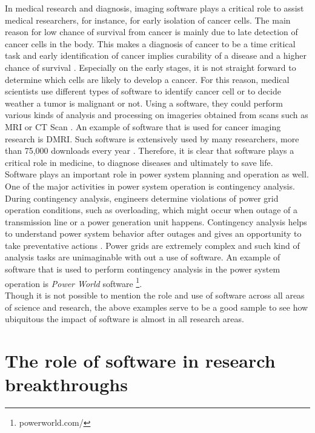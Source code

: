 In medical research and diagnosis, imaging software plays a critical role to assist medical researchers, for instance, for early isolation of cancer cells.  The main reason for low chance of survival from cancer is mainly due to late detection of cancer cells in the body. This makes a diagnosis of cancer to be a time critical task and early identification of cancer implies curability of a disease and a higher chance of survival \citep{wagner2004challenges}. Especially on the early stages, it is not straight forward to determine which cells are likely to develop a cancer. For this reason, medical scientists use different types of software to identify cancer cell or to decide weather a tumor is malignant or not. Using a software, they could perform various kinds of analysis and processing on imageries obtained from scans such as \ac{MRI} or \ac{CT} Scan \citep{al2012lung}. An example of software that is used for cancer imaging research is DMRI. Such software is extensively used by many researchers, more than 75,000 downloads every year \citep{norton2017slicerdmri}. Therefore, it is clear that software plays a critical role in medicine, to diagnose diseases and ultimately to save life. \\


Software plays an important role in power system planning and operation as well. One of the major activities in power system operation is contingency analysis. During contingency analysis, engineers determine violations of power grid operation conditions, such as overloading, which might occur when outage of a transmission line or a power generation unit happens. Contingency analysis helps to understand power system behavior after outages and gives an opportunity to take preventative actions \citep{mishra2012contingency}. Power grids are extremely complex and such kind of analysis tasks are unimaginable with out a use of software. An example of software that is used to perform contingency analysis in the power system operation is \emph{Power World} software  \footnote{powerworld.com/}. \\

Though it is not possible to mention the role and use of software across all areas of science and research, the above examples serve to be a good sample to see how ubiquitous the impact of software is  almost in all research areas. 


%

\section{The role of software in research breakthroughs }
\label{sec:Roles:breakthroughs}


